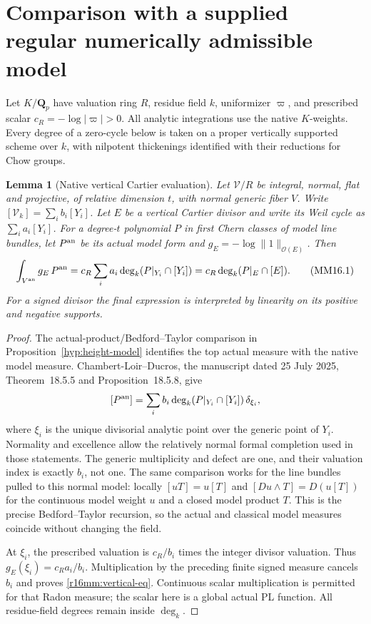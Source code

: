 \documentclass[11pt,a4paper]{article}
\newtheorem{lemma}[theorem]{Lemma}
\theoremstyle{definition}
\theoremstyle{remark}
\numberwithin{equation}{section}
\begin{document}
\section{Comparison with a supplied regular numerically admissible model}
\label{r16mm:section}

Let $K/\mathbf Q_p$ have valuation ring $R$, residue field $k$,
uniformizer $\varpi$, and prescribed scalar
$c_R=-\log|\varpi|>0$. All analytic integrations use the native
$K$-weights. Every degree of a zero-cycle below is taken on a
proper vertically supported scheme over $k$, with nilpotent
thickenings identified with their reductions for Chow groups.

\begin{lemma}[Native vertical Cartier evaluation]
\label{r16mm:vertical}
Let $\mathcal V/R$ be integral, normal, flat and projective,
of relative dimension $t$, with normal generic fiber $V$.
Write $[\mathcal V_k]=\sum_i b_i[Y_i]$. Let $E$ be a vertical
Cartier divisor and write its Weil cycle as $\sum_i a_i[Y_i]$.
For a degree-$t$ polynomial $P$ in first Chern classes of model
line bundles, let $P^{\rm an}$ be its actual model form and
$g_E=-\log\|1\|_{\mathcal O(E)}$. Then
\[
 \int_{V^{\rm an}}g_E\,P^{\rm an}
     =c_R\sum_i a_i\deg_k(P|_{Y_i}\cap[Y_i])
     =c_R\deg_k(P|_E\cap[E]).
 \tag{MM16.1}\label{r16mm:vertical-eq}
\]
For a signed divisor the final expression is interpreted by
linearity on its positive and negative supports.
\end{lemma}

\begin{proof}
The actual-product/Bedford--Taylor comparison in
Proposition~\ref{hyp:height-model} identifies the top actual measure with
the native model measure. Chambert-Loir--Ducros, the manuscript
dated 25 July 2025, Theorem~18.5.5 and Proposition~18.5.8, give
\[
 [P^{\rm an}]=\sum_i b_i\deg_k(P|_{Y_i}\cap[Y_i])\,\delta_{\xi_i},
\]
where $\xi_i$ is the unique divisorial analytic point over the
generic point of $Y_i$. Normality and excellence allow the
relatively normal formal completion used in those statements.
The generic multiplicity and defect are one, and their valuation
index is exactly $b_i$, not one. The same comparison works
for the line bundles pulled to this normal model: locally
$[uT]=u[T]$ and $[Du\wedge T]=D(u[T])$ for the continuous model
weight $u$ and a closed model product $T$. This is the precise
Bedford--Taylor recursion, so the actual and classical model
measures coincide without changing the field.

At $\xi_i$, the prescribed valuation is $c_R/b_i$ times the
integer divisor valuation. Thus $g_E(\xi_i)=c_Ra_i/b_i$.
Multiplication by the preceding finite signed measure cancels
$b_i$ and proves \eqref{r16mm:vertical-eq}. Continuous scalar
multiplication is permitted for that Radon measure; the scalar
here is a global actual PL function. All residue-field degrees
remain inside $\deg_k$.
\end{proof}
\end{document}
